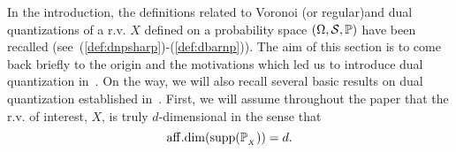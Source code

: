 
In the introduction, the definitions related to Voronoi (or regular)and  dual quantizations of a r.v.  $X$ defined on a probability space $(\Omega,{\cal S}, \mathbb{P})$ have been recalled (see~(\ref{def:dnpsharp})-(\ref{def:dbarnp})). 
The aim of this section is to come back briefly to the origin and the
motivations which led us to introduce dual quantization in~\cite{dualStat}. On the way, we will also recall several basic results on dual quantization established in~\cite{dualStat}.
First, we will assume throughout the paper that the r.v.  of interest, $X$, is
truly  $d$-dimensional in the sense that
\[
{\rm aff.dim}({\rm supp}(\mathbb{P}_{_X})) =  d.
\] 
 
